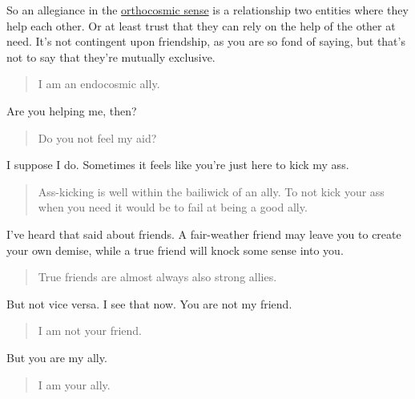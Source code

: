 So an allegiance in the \href{http://wiki.postfurry.net/wiki/Metacosmology}{orthocosmic sense} is a relationship two entities where they help each other. Or at least trust that they can rely on the help of the other at need. It's not contingent upon friendship, as you are so fond of saying, but that's not to say that they're mutually exclusive.

\begin{quote}
I am an endocosmic ally.
\end{quote}

Are you helping me, then?

\begin{quote}
Do you not feel my aid?
\end{quote}

I suppose I do. Sometimes it feels like you're just here to kick my ass.

\begin{quote}
Ass-kicking is well within the bailiwick of an ally. To not kick your ass when you need it would be to fail at being a good ally.
\end{quote}

I've heard that said about friends. A fair-weather friend may leave you to create your own demise, while a true friend will knock some sense into you.

\begin{quote}
True friends are almost always also strong allies.
\end{quote}

But not vice versa. I see that now. You are not my friend.

\begin{quote}
I am not your friend.
\end{quote}

But you are my ally.

\begin{quote}
I am your ally.
\end{quote}
